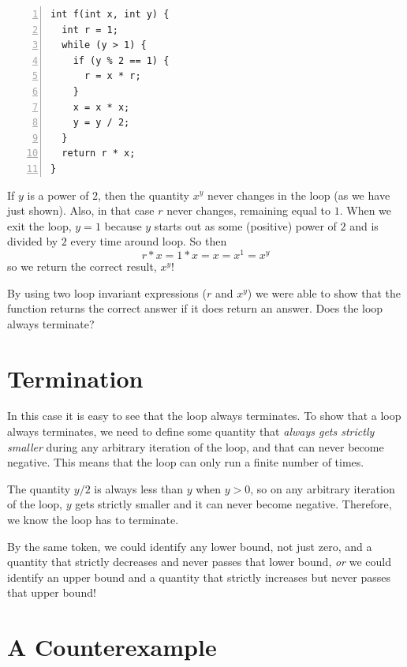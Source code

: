 \begin{lstlisting}[language={[C0]C}, numbers=left]
int f(int x, int y) {
  int r = 1;
  while (y > 1) {
    if (y % 2 == 1) {
      r = x * r;
    }
    x = x * x;
    y = y / 2;
  }
  return r * x;
}
\end{lstlisting}

\noindent
If $y$ is a power of $2$, then the quantity $x^y$ never changes in the
loop (as we have just shown).  Also, in that case $r$ never changes,
remaining equal to $1$.  When we exit the loop, $y = 1$ because $y$
starts out as some (positive) power of $2$ and is divided by $2$ every
time around loop.  So then
$$
r * x = 1 * x = x = x^1 = x^y
$$
so we return the correct result, $x^y$!

By using two loop invariant expressions ($r$ and $x^y$) we were
able to show that the function returns the correct answer if it
does return an answer.  Does the loop always terminate?


\clearpage
\section{Termination}
\label{sec:contracts:termination}

In this case it is easy to see that the loop always terminates.  To
show that a loop always terminates, we need to define some quantity
that \emph{always gets strictly smaller} during any arbitrary
iteration of the loop, and that can never
become negative. This means that the loop can only run a finite number
of times.

The quantity $y/2$ is always less than $y$ when $y > 0$, so on any arbitrary
iteration of the loop, $y$ gets strictly smaller and it can never become
negative. Therefore, we know the loop has to terminate.

\begin{note}
By the same token, we could identify any lower bound, not just zero, and a
quantity that strictly decreases and never passes that lower bound, \emph{or}
we could identify an upper bound and a quantity that strictly increases but
never passes that upper bound!
\end{note}


\clearpage
\section{A Counterexample}
\label{sec:contracts:bugs}

